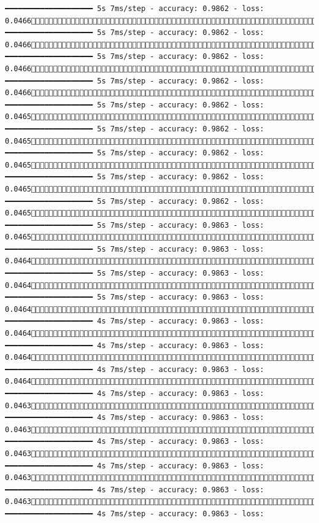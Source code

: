 \documentclass[
  letterpaper,
  DIV=11,
  numbers=noendperiod]{scrreprt}
\begin{document}
\begin{verbatim}
━━━━━━━━━━━━━━━━━━━━ 5s 7ms/step - accuracy: 0.9862 - loss: 0.04661112/1875 ━━━━━━━━━━━━━━━━━━━━ 5s 7ms/step - accuracy: 0.9862 - loss: 0.04661120/1875 ━━━━━━━━━━━━━━━━━━━━ 5s 7ms/step - accuracy: 0.9862 - loss: 0.04661128/1875 ━━━━━━━━━━━━━━━━━━━━ 5s 7ms/step - accuracy: 0.9862 - loss: 0.04661136/1875 ━━━━━━━━━━━━━━━━━━━━ 5s 7ms/step - accuracy: 0.9862 - loss: 0.04651144/1875 ━━━━━━━━━━━━━━━━━━━━ 5s 7ms/step - accuracy: 0.9862 - loss: 0.04651152/1875 ━━━━━━━━━━━━━━━━━━━━ 5s 7ms/step - accuracy: 0.9862 - loss: 0.04651160/1875 ━━━━━━━━━━━━━━━━━━━━ 5s 7ms/step - accuracy: 0.9862 - loss: 0.04651168/1875 ━━━━━━━━━━━━━━━━━━━━ 5s 7ms/step - accuracy: 0.9862 - loss: 0.04651175/1875 ━━━━━━━━━━━━━━━━━━━━ 5s 7ms/step - accuracy: 0.9863 - loss: 0.04651183/1875 ━━━━━━━━━━━━━━━━━━━━ 5s 7ms/step - accuracy: 0.9863 - loss: 0.04641190/1875 ━━━━━━━━━━━━━━━━━━━━ 5s 7ms/step - accuracy: 0.9863 - loss: 0.04641197/1875 ━━━━━━━━━━━━━━━━━━━━ 5s 7ms/step - accuracy: 0.9863 - loss: 0.04641204/1875 ━━━━━━━━━━━━━━━━━━━━ 4s 7ms/step - accuracy: 0.9863 - loss: 0.04641212/1875 ━━━━━━━━━━━━━━━━━━━━ 4s 7ms/step - accuracy: 0.9863 - loss: 0.04641219/1875 ━━━━━━━━━━━━━━━━━━━━ 4s 7ms/step - accuracy: 0.9863 - loss: 0.04641227/1875 ━━━━━━━━━━━━━━━━━━━━ 4s 7ms/step - accuracy: 0.9863 - loss: 0.04631235/1875 ━━━━━━━━━━━━━━━━━━━━ 4s 7ms/step - accuracy: 0.9863 - loss: 0.04631242/1875 ━━━━━━━━━━━━━━━━━━━━ 4s 7ms/step - accuracy: 0.9863 - loss: 0.04631250/1875 ━━━━━━━━━━━━━━━━━━━━ 4s 7ms/step - accuracy: 0.9863 - loss: 0.04631258/1875 ━━━━━━━━━━━━━━━━━━━━ 4s 7ms/step - accuracy: 0.9863 - loss: 0.04631265/1875 ━━━━━━━━━━━━━━━━━━━━ 4s 7ms/step - accuracy: 0.9863 - loss: 
\end{verbatim}
\end{document}
